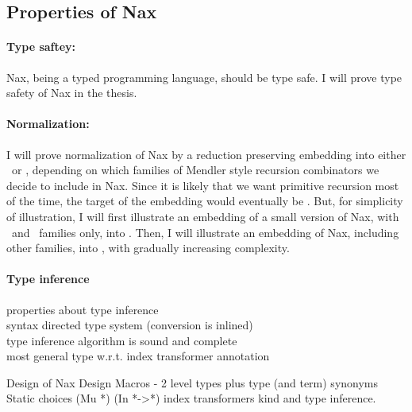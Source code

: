 \subsection{Properties of Nax}\label{sec:Nax:theory}
\paragraph{Type saftey:}
Nax, being a typed programming language, should be type safe.
I will prove type safety of Nax in the thesis.

\paragraph{Normalization:}
I will prove normalization of Nax by a reduction preserving embedding into
either \Fi\ or \Fixw, depending on which families of Mendler style recursion
combinators we decide to include in Nax. Since it is likely that we want
primitive recursion most of the time, the target of the embedding would
eventually be \Fixw. But, for simplicity of illustration, I will first
illustrate an embedding of a small version of Nax, with \MIt\ and \MsfIt\
families only, into \Fi. Then, I will illustrate an embedding of Nax,
including other families, into \Fixw, with gradually increasing complexity.

\paragraph{Type inference}
properties about type inference \\
syntax directed type system (conversion is inlined) \\
type inference algorithm is sound and complete \\
most general type w.r.t. index transformer annotation

Design of Nax
    Design Macros - 2 level types plus type (and term) synonyms
    Static choices (Mu *)  (In *->*)   index transformers
    kind and type inference.

